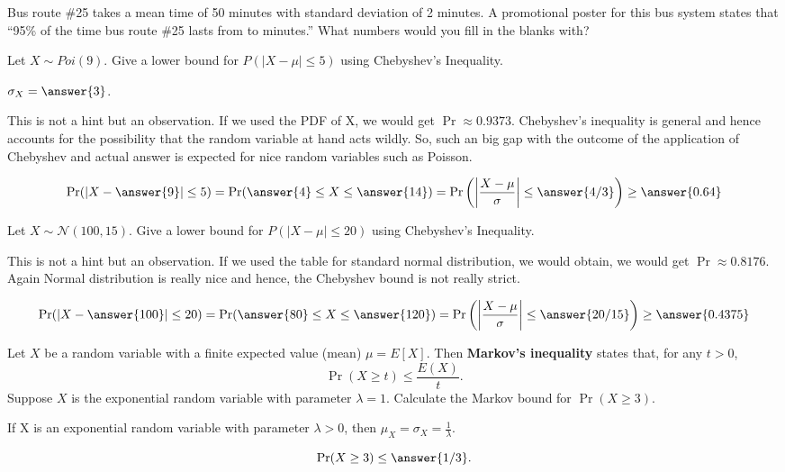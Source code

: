 \documentclass[handout]{ximera}
\begin{document}
\begin{problem}

Bus route \#25 takes a mean time of 50 minutes with standard deviation of 2 minutes. A promotional poster for this bus system states that ``95\% of the time bus route \#25 lasts from  to  minutes.'' What numbers would you fill in the blanks with?
\end{problem}



\begin{problem}
 Let $X \sim Poi(9)$. Give a lower bound for $P( |X -\mu| \leq 5)$ using Chebyshev's Inequality.
\begin{hint}
\item $\sigma_X=\answer{3}$.
\item This is not a hint but an observation. If we used the PDF of X, we would get $\Pr\approx 0.9373$. Chebyshev's inequality is general and hence accounts for the possibility that the random variable at hand acts wildly. So, such an big gap with the outcome of the application of Chebyshev and actual answer is expected for nice random variables such as Poisson. 
\end{hint}
\begin{prompt}
$$\Pr( |X -\answer{9}| \leq 5)=\Pr(\answer{4} \leq X \leq \answer{14})=\Pr\left(\left|\frac{X-\mu}{\sigma}\right| \leq \answer{4/3}\right)\geq \answer{0.64}$$
\end{prompt}
\end{problem}


\begin{problem}
 Let $X \sim \mathcal N (100,15) $. Give a lower bound for $P( |X -\mu| \leq 20)$ using Chebyshev's Inequality.
\begin{hint}
This is not a hint but an observation. If we used the table for standard normal distribution, we would obtain, we would get $\Pr\approx 0.8176$. Again Normal distribution is really nice and hence, the Chebyshev bound is not really strict.
\end{hint}
\begin{prompt}
$$\Pr( |X -\answer{100}| \leq 20)=\Pr(\answer{80} \leq X \leq \answer{120})=\Pr\left(\left|\frac{X-\mu}{\sigma}\right| \leq \answer{20/15}\right)\geq \answer{0.4375}$$
\end{prompt}
\end{problem}

\begin{problem}
Let $X$ be a random variable with a finite expected value (mean) $\mu=E[X]$. Then {\bf Markov's inequality} states that, for any $t>0$, 
$$\Pr(X\geq t)\leq \frac{E(X)}{t}.$$ Suppose $X$ is the exponential random variable with parameter $\lambda=1$. Calculate the Markov bound for $\Pr(X\geq 3)$. 
\begin{hint}
If X is an exponential random variable with parameter $\lambda>0$, then $\mu_X=\sigma_X=\frac{1}{\lambda}$.
\end{hint}
\begin{prompt}%
$$\Pr(X\geq 3)\leq \answer{1/3}.$$

\end{prompt}
\end{problem}
\end{document}
